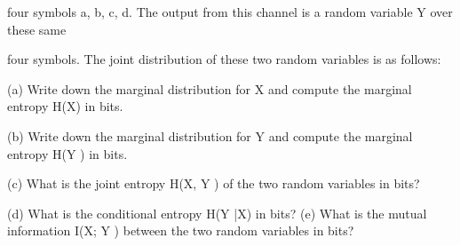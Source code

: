 four symbols a, b, c, d. The output from this channel is a random variable Y over these same

four symbols. The joint distribution of these two random variables is as follows:


(a) Write down the marginal distribution for X and compute the marginal entropy H(X) in bits.

(b) Write down the marginal distribution for Y and compute the marginal entropy H(Y ) in bits.

(c) What is the joint entropy H(X, Y ) of the two random variables in bits?

(d) What is the conditional entropy H(Y |X) in bits?
(e) What is the mutual information I(X; Y ) between the two random variables in bits?
